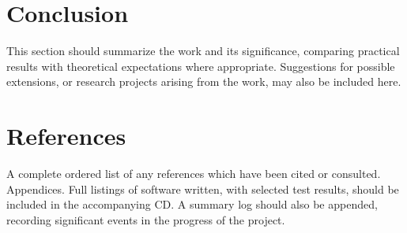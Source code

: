 \documentclass{l4proj}
\begin{document}
\chapter{Conclusion}\label{conclusion}
This section should summarize the work and its significance, comparing practical results with theoretical expectations where appropriate. Suggestions for possible extensions, or research projects arising from the work, may also be included here.

\chapter{References}
 A complete ordered list of any references which have been cited or consulted.
Appendices. Full listings of software written, with selected test results, should be included in the accompanying CD. A summary log should also be appended, recording significant events in the progress of the project.

\printbibliography
\end{document}
